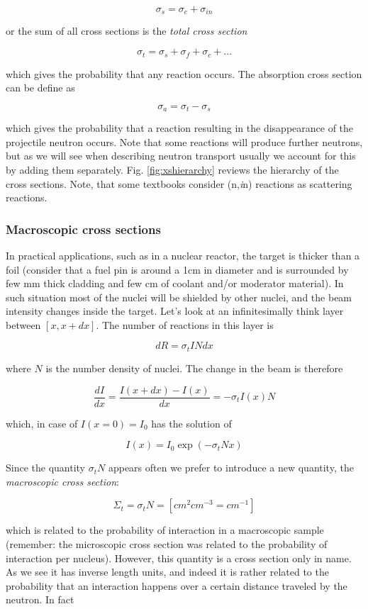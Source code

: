 \[
\sigma_s=\sigma_e + \sigma_{in}
\]

or the sum of all cross sections is the \textit{total cross section}

\[
\sigma_t=\sigma_s + \sigma_{f}+ \sigma_{c} + ...
\]

which gives the probability that any reaction occurs. The absorption cross section can be define as 


\[
\sigma_a=\sigma_t - \sigma_s
\]

which gives the probability that a reaction resulting in the disappearance of the projectile neutron occurs. Note that some reactions will produce further neutrons, but as we will see when describing neutron transport usually we account for this by adding them separately. Fig. \ref{fig:xshierarchy} reviews the hierarchy of the cross sections. Note, that some textbooks consider (n,\textit{i}n) reactions as scattering reactions.

\subsubsection{Macroscopic cross sections}

In practical applications, such as in a nuclear reactor, the target is thicker than a foil (consider that a fuel pin is around a 1cm in diameter and is surrounded by few mm thick cladding and few cm of coolant and/or moderator material). In such situation most of the nuclei will be shielded by other nuclei, and the beam intensity changes inside the target. Let's look at an infinitesimally think layer between $[x,x+dx]$. The number of reactions in this layer is

\[
dR=\sigma_t I N dx
\]

\noindent where $N$ is the number density of nuclei. The change in the beam is therefore

\[
\frac{dI}{dx}=\frac{I(x+dx)-I(x)}{dx}=-\sigma_tI(x)N
\]

\noindent which, in case of $I(x=0)=I_0$ has the solution of

\[
I(x)=I_0\exp(-\sigma_tNx)
\]

Since the quantity $\sigma_t N$ appears often we prefer to introduce a new quantity, the \textit{macroscopic cross section}:

\[
\Sigma_t=\sigma_tN=[cm^{2}cm^{-3}=cm^{-1}]
\] 

\noindent which is related to the probability of interaction in a macroscopic sample (remember: the microscopic cross section was related to the probability of interaction per nucleus). However, this quantity is a cross section only in name. As we see it has inverse length units, and indeed it is rather related to the probability that an interaction happens over a certain distance traveled by the neutron. In fact

